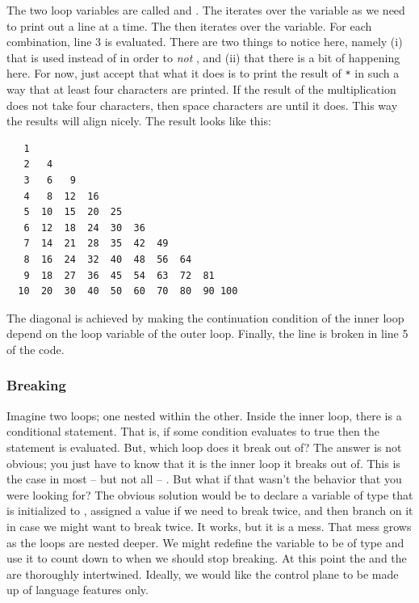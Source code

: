 \inputminted[linenos]{csharp}{../src/csharp/flow_repetition/nesting/Program.cs}

The two loop variables are called  and . The  iterates over the  variable as we need to print out a line at a time. The  then iterates over the  variable. For each combination, line 3 is evaluated. There are two things to notice here, namely (i) that  is used instead of  in order to \textsl{not} , and (ii) that there is a bit of  happening here. For now, just accept that what it does is to print the result of \texttt{*} in such a way that at least four characters are printed. If the result of the multiplication does not take four characters, then space characters are  until it does. This way the results will align nicely. The result looks like this:

\begin{verbatim}
   1
   2   4
   3   6   9
   4   8  12  16
   5  10  15  20  25
   6  12  18  24  30  36
   7  14  21  28  35  42  49
   8  16  24  32  40  48  56  64
   9  18  27  36  45  54  63  72  81
  10  20  30  40  50  60  70  80  90 100
\end{verbatim}

The diagonal is achieved by making the continuation condition of the inner loop depend on the loop variable of the outer loop. Finally, the line is broken in line 5 of the code.

\subsubsection{Breaking}

Imagine two loops; one nested within the other. Inside the inner loop, there is a conditional  statement. That is, if some condition evaluates to true then the  statement is evaluated. But, which loop does it break out of? The answer is not obvious; you just have to know that it is the inner loop it breaks out of. This is the case in most -- but not all -- . But what if that wasn't the behavior that you were looking for? The obvious solution would be to declare a  variable of type  that is initialized to , assigned a  value if we need to break twice, and then branch on it in case we might want to break twice. It works, but it is a mess. That mess grows as the loops are nested deeper. We might redefine the variable to be of type  and use it to count down to when we should stop breaking. At this point the  and the  are thoroughly intertwined. Ideally, we would like the control plane to be made up of language features only.

